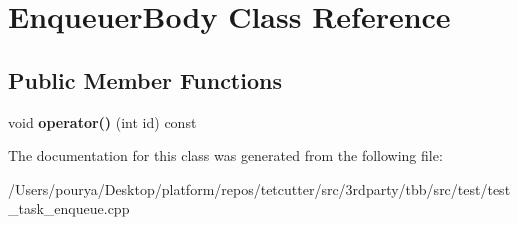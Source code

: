 \hypertarget{classEnqueuerBody}{}\section{Enqueuer\+Body Class Reference}
\label{classEnqueuerBody}
\subsection*{Public Member Functions}
\begin{DoxyCompactItemize}
\item 
\hypertarget{classEnqueuerBody_a4034d895421aadaa53704fad36ae94fb}{}void {\bfseries operator()} (int id) const \label{classEnqueuerBody_a4034d895421aadaa53704fad36ae94fb}

\end{DoxyCompactItemize}


The documentation for this class was generated from the following file\+:\begin{DoxyCompactItemize}
\item 
/\+Users/pourya/\+Desktop/platform/repos/tetcutter/src/3rdparty/tbb/src/test/test\+\_\+task\+\_\+enqueue.\+cpp\end{DoxyCompactItemize}
